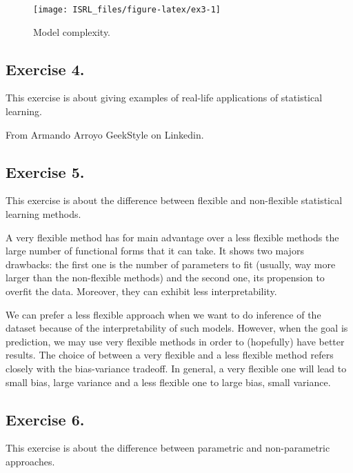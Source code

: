 \documentclass[]{book}
\begin{document}
\begin{figure}

{\centering \texttt{[image: ISRL\_files/figure-latex/ex3-1]} 

}

\caption{Model complexity.}\label{fig:ex3}
\end{figure}

\hypertarget{exercise-4.}{%
\subsection{Exercise 4.}\label{exercise-4.}}

This exercise is about giving examples of real-life applications of statistical learning.

\protect\hypertarget{fig:ml_appli}{}{}

From Armando Arroyo GeekStyle on Linkedin.

\hypertarget{exercise-5.}{%
\subsection{Exercise 5.}\label{exercise-5.}}

This exercise is about the difference between flexible and non-flexible statistical learning methods.

A very flexible method has for main advantage over a less flexible methods the large number of functional forms that it can take. It shows two majors drawbacks: the first one is the number of parameters to fit (usually, way more larger than the non-flexible methods) and the second one, its propension to overfit the data. Moreover, they can exhibit less interpretability.

We can prefer a less flexible approach when we want to do inference of the dataset because of the interpretability of such models. However, when the goal is prediction, we may use very flexible methods in order to (hopefully) have better results. The choice of between a very flexible and a less flexible method refers closely with the bias-variance tradeoff. In general, a very flexible one will lead to small bias, large variance and a less flexible one to large bias, small variance.

\hypertarget{exercise-6.}{%
\subsection{Exercise 6.}\label{exercise-6.}}

This exercise is about the difference between parametric and non-parametric approaches.
\end{document}
